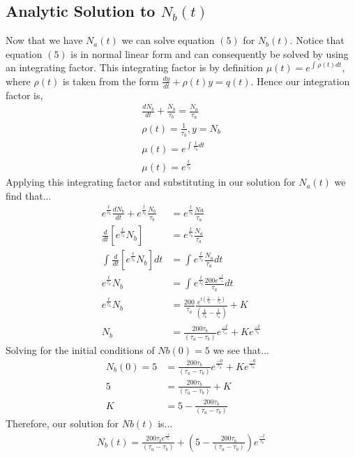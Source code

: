 \documentclass[twocolumn]{article}
\begin{document}
\subsection{Analytic Solution to $N_b(t)$}
\hspace{\parindent} Now that we have $N_a(t)$ we can solve equation $(5)$ for $N_b(t)$. Notice that equation $(5)$ is in normal linear form and can consequently be solved by using an integrating factor. This integrating factor is by definition $\mu(t)=e^{\int_{}{}\rho(t)dt}$, where $\rho(t)$ is taken from the form $\frac{dy}{dt}+\rho(t)y=q(t)$. Hence our integration factor is, 
	\begin{align}
	\frac{dN_b}{dt}+\frac{N_b}{\tau_b}=\frac{N_a}{\tau_a}\\
	\rho(t)=\frac{1}{\tau_b}, y=N_b\\
	\mu(t)=e^{\int_{}{}\frac{1}{\tau_b}dt}\\
	\mu(t)=e^{\frac{t}{\tau_b}}
	\end{align}
Applying this integrating factor and substituting in our solution for $N_a(t)$ we find that...
	\begin{align}
	e^{\frac{t}{\tau_b}}\frac{dN_b}{dt}+e^{\frac{t}{\tau_b}}\frac{N_b}{\tau_b}&=e^{\frac{t}{\tau_b}}\frac{Na}{\tau_a}\\
	\frac{d}{dt}\left[e^{\frac{t}{\tau_b}}N_b\right]&=e^{\frac{t}{\tau_b}}\frac{N_a}{\tau_a}\\
	\int_{}{}\frac{d}{dt}\left[e^{\frac{t}{\tau_b}}N_b\right]dt&=\int_{}{}e^{\frac{t}{\tau_b}}\frac{N_a}{\tau_a}dt\\
	e^{\frac{t}{\tau_b}}N_b&=\int_{}{}e^{\frac{t}{\tau_b}}\frac{200e^{\frac{-t}{\tau_a}}}{\tau_a}dt\\
	e^{\frac{t}{\tau_b}}N_b&=\frac{200}{\tau_a}\frac{e^{t\left(\frac{1}{\tau_b}-\frac{1}{\tau_a}\right)}}{\left(\frac{1}{\tau_b}-\frac{1}{\tau_a}\right)}+K\\
	N_b&=\frac{200\tau_b}{\left(\tau_a-\tau_b\right)}e^{\frac{-t}{\tau_a}}+Ke^{\frac{-t}{\tau_b}}	
	\end{align}
Solving for the initial conditions of $Nb(0)=5$ we see that...
	\begin{align}
	N_b(0)=5&=\frac{200\tau_b}{\left(\tau_a-\tau_b\right)}e^{\frac{-0}{\tau_a}}+Ke^{\frac{-0}{\tau_b}}\\
	5&=\frac{200\tau_b}{\left(\tau_a-\tau_b\right)}+K\\
	K&=5-\frac{200\tau_b}{\left(\tau_a-\tau_b\right)}
	\end{align}
Therefore, our solution for $Nb(t)$ is...
	\begin{align}
	N_b(t)=\frac{200\tau_be^{\frac{-t}{\tau_a}}}{\left(\tau_a-\tau_b\right)}+\left(5-\frac{200\tau_b}{\left(\tau_a-\tau_b\right)}\right)e^{\frac{-t}{\tau_b}}
	\end{align}
\end{document}
